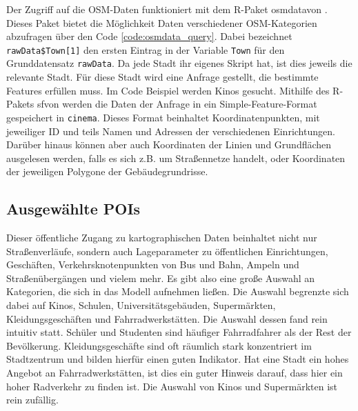 \documentclass[a4paper,12pt]{thesis}
\begin{document}
Der Zugriff auf die OSM-Daten funktioniert mit dem R-Paket \glqq osmdata\grqq von \cite{Padgham2017}. Dieses Paket bietet die Möglichkeit Daten verschiedener OSM-Kategorien abzufragen über den Code \ref{code:osmdata_query}. Dabei bezeichnet \lstinline|rawData$Town[1]| den ersten Eintrag in der Variable \lstinline|Town| für den Grunddatensatz \lstinline|rawData|. Da jede Stadt ihr eigenes Skript hat, ist dies jeweils die relevante Stadt. Für diese Stadt wird eine Anfrage gestellt, die bestimmte Features erfüllen muss. Im Code Beispiel werden Kinos gesucht. Mithilfe des R-Pakets \glqq sf\grqq von \cite{Pebesma2018} werden die Daten der Anfrage in ein Simple-Feature-Format gespeichert in \lstinline|cinema|. Dieses Format beinhaltet Koordinatenpunkten, mit jeweiliger ID und teils Namen und Adressen der verschiedenen Einrichtungen. Darüber hinaus können aber auch Koordinaten der Linien und Grundflächen ausgelesen werden, falls es sich z.B. um Straßennetze handelt, oder Koordinaten der jeweiligen Polygone der Gebäudegrundrisse.


\subsection{Ausgewählte POIs}

Dieser öffentliche Zugang zu kartographischen Daten beinhaltet nicht nur Straßenverläufe, sondern auch Lageparameter zu öffentlichen Einrichtungen, Geschäften, Verkehrsknotenpunkten von Bus und Bahn, Ampeln und Straßenübergängen und vielem mehr. Es gibt also eine große Auswahl an Kategorien, die sich in das Modell aufnehmen ließen. Die Auswahl begrenzte sich dabei auf Kinos, Schulen, Universitätsgebäuden, Supermärkten, Kleidungsgeschäften und Fahrradwerkstätten. Die Auswahl dessen fand rein intuitiv statt. Schüler und Studenten sind häufiger Fahrradfahrer als der Rest der Bevölkerung. Kleidungsgeschäfte sind oft räumlich stark konzentriert im Stadtzentrum und bilden hierfür einen guten Indikator. Hat eine Stadt ein hohes Angebot an Fahrradwerkstätten, ist dies ein guter Hinweis darauf, dass hier ein hoher Radverkehr zu finden ist. Die Auswahl von Kinos und Supermärkten ist rein zufällig.\\
\end{document}
